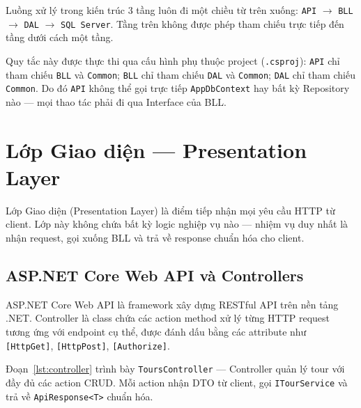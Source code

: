 Luồng xử lý trong kiến trúc 3 tầng luôn đi một chiều từ trên
xuống: \texttt{API} $\rightarrow$ \texttt{BLL} $\rightarrow$
\texttt{DAL} $\rightarrow$ \texttt{SQL Server}. Tầng trên không
được phép tham chiếu trực tiếp đến tầng dưới cách một tầng.

Quy tắc này được thực thi qua cấu hình phụ thuộc project
(\texttt{.csproj}): \texttt{API} chỉ tham chiếu \texttt{BLL}
và \texttt{Common}; \texttt{BLL} chỉ tham chiếu \texttt{DAL}
và \texttt{Common}; \texttt{DAL} chỉ tham chiếu \texttt{Common}.
Do đó \texttt{API} không thể gọi trực tiếp \texttt{AppDbContext}
hay bất kỳ Repository nào — mọi thao tác phải đi qua Interface
của BLL. \QEDAa


\section{Lớp Giao diện — Presentation Layer}\label{Sec3.2}

Lớp Giao diện (Presentation Layer) là điểm tiếp nhận mọi
yêu cầu HTTP từ client. Lớp này không chứa bất kỳ logic
nghiệp vụ nào — nhiệm vụ duy nhất là nhận request, gọi
xuống BLL và trả về response chuẩn hóa cho client.

\subsection{ASP.NET Core Web API và Controllers}\label{sub3.2.1}

ASP.NET Core Web API là framework xây dựng RESTful API trên
nền tảng .NET. Controller là class chứa các action method xử
lý từng HTTP request tương ứng với endpoint cụ thể, được
đánh dấu bằng các attribute như \texttt{[HttpGet]},
\texttt{[HttpPost]}, \texttt{[Authorize]}.

Đoạn~\ref{lst:controller} trình bày \texttt{ToursController}
— Controller quản lý tour với đầy đủ các action CRUD.
Mỗi action nhận DTO từ client, gọi \texttt{ITourService}
và trả về \texttt{ApiResponse<T>} chuẩn hóa.

